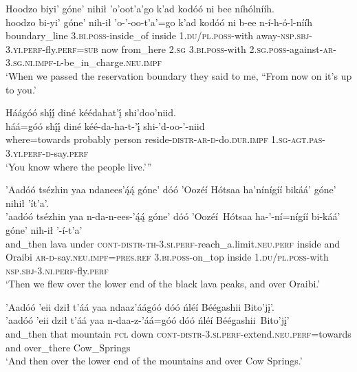 \ea\label{ex:text9-3-4}
Hoodzo biyi’ góne’ nihił ’o’oot’a’go k’ad kodóó ni bee níhólnííh.\\
\gll hoodzo	bi-yi’	góne’	nih-ił	’o-’-oo-t’a’=go	k’ad	kodóó	ni	b-ee	n-í-h-ó-l-nííh\\
     boundary\_line	3.\textsc{bi}.\textsc{poss}-inside\_of	inside	1.\textsc{du}/\textsc{pl}.\textsc{poss}-with	away-\textsc{nsp}.\textsc{sbj}-3.\textsc{yi}.\textsc{perf}-fly.\textsc{perf}=\textsc{sub}	now	from\_here	2.\textsc{sg}	3.\textsc{bi}.\textsc{poss}-with	\textsc{2}.\textsc{sg}.\textsc{poss}-against-\textsc{ar}-3.\textsc{sg}.\textsc{ni}.\textsc{impf}-\textsc{l}-be\_in\_charge.\textsc{neu}.\textsc{impf}\\
\glt `When we passed the reservation boundary they said to me, “From now on it's up to you.'
\z

\ea\label{ex:text9-3-5}
Háágóó shį́į́ diné kéédahat’į́ shi’doo’niid.\\
\gll háá=góó	shį́į́	diné	kéé-da-ha-t-’į́	shi-’d-oo-’-niid\\
     where=towards	probably	person	reside-\textsc{distr}-\textsc{ar}-\textsc{d}-do.\textsc{dur}.\textsc{impf}	1.\textsc{sg}-\textsc{agt}.\textsc{pas}-3.\textsc{yi}.\textsc{perf}-\textsc{d}-say.\textsc{perf}\\
\glt `You know where the people live.'''
\z

\ea\label{ex:text9-3-6}
’Aadóó tsézhin yaa ndanees’ą́ą́ góne’ dóó ’Oozéí Hótsaa ha’nínígíí bikáá’ góne’ nihił ’ít’a’.\\
\gll ’aadóó	tsézhin	yaa	n-da-n-ees-’ą́ą́	góne’	dóó	’Oozéí~{Hótsaa}	ha-’-ní=nígíí	bi-káá’	góne’	nih-ił	’-í-t’a’\\
     and\_then	lava	under	\textsc{cont}-\textsc{distr}-\textsc{th}-3.\textsc{si}.\textsc{perf}-reach\_a.limit.\textsc{neu}.\textsc{perf}	inside	and	Oraibi	\textsc{ar}-\textsc{d}-say.\textsc{neu}.\textsc{impf}=\textsc{pres}.\textsc{ref}	3.\textsc{bi}.\textsc{poss}-on\_top	inside	1.\textsc{du}/\textsc{pl}.\textsc{poss}-with	\textsc{nsp}.\textsc{sbj}-3.\textsc{ni}.\textsc{perf}-fly.\textsc{perf}\\
\glt `Then we flew over the lower end of the black lava peaks, and over Oraibi.'
\z

\ea\label{ex:text9-3-7}
’Aadóó ’eii dził t’áá yaa ndaaz’áágóó dóó ńléí Béégashii Bito’jį’.\\
\gll ’aadóó	’eii	dził	t’áá	yaa	n-daa-z-’áá=góó	dóó	ńléí	Béégashii~{Bito’jį’}\\
     and\_then	that	mountain	\textsc{pcl}	down	\textsc{cont}-\textsc{distr}-3.\textsc{si}.\textsc{perf}-extend.\textsc{neu}.\textsc{perf}=towards	and	over\_there	Cow\_Springs\\
\glt `And then over the lower end of the mountains and over Cow Springs.'
\z

